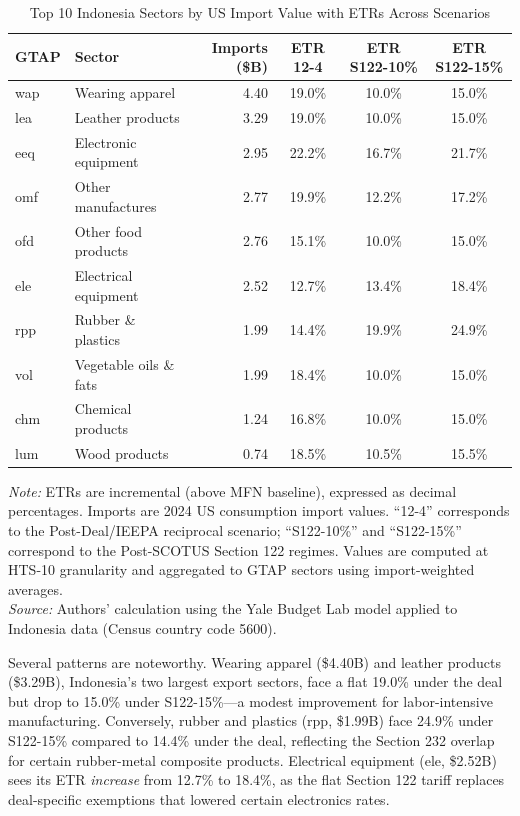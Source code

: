 \documentclass[12pt,a4paper]{article}
\begin{document}
\begin{table}[htbp]
\centering
\caption{Top 10 Indonesia Sectors by US Import Value with ETRs Across Scenarios}
\small
\begin{tabular}{llrccc}
\toprule
\textbf{GTAP} & \textbf{Sector} & \textbf{Imports (\$B)} & \textbf{ETR 12-4} & \textbf{ETR S122-10\%} & \textbf{ETR S122-15\%} \\
\midrule
wap & Wearing apparel       & 4.40 & 19.0\% & 10.0\% & 15.0\% \\
lea & Leather products      & 3.29 & 19.0\% & 10.0\% & 15.0\% \\
eeq & Electronic equipment  & 2.95 & 22.2\% & 16.7\% & 21.7\% \\
omf & Other manufactures    & 2.77 & 19.9\% & 12.2\% & 17.2\% \\
ofd & Other food products   & 2.76 & 15.1\% & 10.0\% & 15.0\% \\
ele & Electrical equipment  & 2.52 & 12.7\% & 13.4\% & 18.4\% \\
rpp & Rubber \& plastics    & 1.99 & 14.4\% & 19.9\% & 24.9\% \\
vol & Vegetable oils \& fats & 1.99 & 18.4\% & 10.0\% & 15.0\% \\
chm & Chemical products     & 1.24 & 16.8\% & 10.0\% & 15.0\% \\
lum & Wood products         & 0.74 & 18.5\% & 10.5\% & 15.5\% \\
\bottomrule
\end{tabular}
\par\smallskip
\begin{minipage}{\linewidth}
\footnotesize
\textit{Note:} ETRs are incremental (above MFN baseline), expressed as decimal percentages. Imports are 2024 US consumption import values. ``12-4'' corresponds to the Post-Deal/IEEPA reciprocal scenario; ``S122-10\%'' and ``S122-15\%'' correspond to the Post-SCOTUS Section 122 regimes. Values are computed at HTS-10 granularity and aggregated to GTAP sectors using import-weighted averages.\\
\textit{Source:} Authors' calculation using the Yale Budget Lab model \cite{yalebudgetlab_model} applied to Indonesia data (Census country code 5600).
\end{minipage}
\label{tab:top10sectors}
\end{table}

Several patterns are noteworthy. Wearing apparel (\$4.40B) and leather products (\$3.29B), Indonesia's two largest export sectors, face a flat 19.0\% under the deal but drop to 15.0\% under S122-15\%---a modest improvement for labor-intensive manufacturing. Conversely, rubber and plastics (rpp, \$1.99B) face 24.9\% under S122-15\% compared to 14.4\% under the deal, reflecting the Section 232 overlap for certain rubber-metal composite products. Electrical equipment (ele, \$2.52B) sees its ETR \textit{increase} from 12.7\% to 18.4\%, as the flat Section 122 tariff replaces deal-specific exemptions that lowered certain electronics rates.
\end{document}
